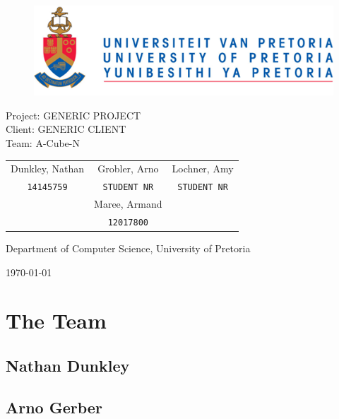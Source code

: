 \documentclass[english]{article}
\date{\today}
\begin{document}
	
	\begin{titlepage}
		\begin{figure}[!t]
			\includegraphics[width=\linewidth]{up_logo.png}
		\end{figure}
		\begin{center}
			\huge{Project: GENERIC PROJECT}\\
			\large{Client: GENERIC CLIENT}\\
			\vspace{10mm}
			\huge{Team: A-Cube-N}\\
		\end{center}
		\begin{center}
			\begin{tabular}{ c c c }
				Dunkley, Nathan & Grobler, Arno & Lochner, Amy \\
				\texttt{14145759} & \texttt{STUDENT NR} & \texttt{STUDENT NR}\\
				& Maree, Armand &\\
				& \texttt{12017800} &
			\end{tabular}
		\end{center}
		\begin{center}
			Department of Computer Science, University of Pretoria
		\end{center}
		\begin{center}
			\today
		\end{center}
	\end{titlepage}
	\newpage
	\tableofcontents
	\newpage
	\section{The Team}
		\subsection{Nathan Dunkley}
		
		\subsection{Arno Gerber}
		
\end{document}
